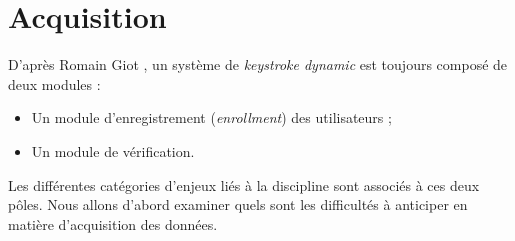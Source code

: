\section{Acquisition}

D'après Romain Giot \cite{giotBenchmark}, un système de \textit{keystroke dynamic} est toujours composé de deux modules :\\

\begin{itemize}
	\item Un module d'enregistrement (\textit{enrollment}) des utilisateurs ;
	\item Un module de vérification.\\
\end{itemize}

Les différentes catégories d'enjeux liés à la discipline sont associés à ces deux pôles. Nous allons d'abord examiner quels sont les difficultés à anticiper en matière d'acquisition des données.



